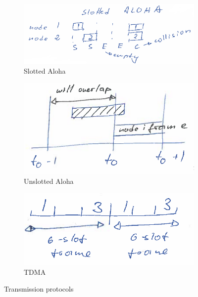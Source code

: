 \documentclass{article}
\begin{document}
\begin{figure}
    \centering
    \begin{subfigure}{0.8\textwidth}
        \centering
        \includegraphics[width=1\textwidth]{figures/slotted_aloha.png}
        \caption{Slotted Aloha}
        \label{fig:slotted_aloha}
    \end{subfigure}
    \vskip 0.6in
    \begin{subfigure}{0.45\textwidth}
        \raggedright
        \includegraphics[width=1\textwidth]{figures/unslotted_aloha.png}
        \caption{Unslotted Aloha}
        \label{fig:unslotted_aloha}
    \end{subfigure}
    \hspace{10mm}
    \begin{subfigure}{0.45\textwidth}
        \raggedright
        \includegraphics[width=1\textwidth]{figures/tdma.png}
        \caption{TDMA}
        \label{fig:tdma}
    \end{subfigure}
    \caption{Transmission protocols}
    \label{fig:scanned}
\end{figure}
\end{document}
